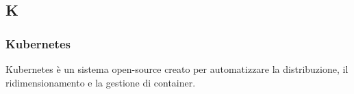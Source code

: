 \subsection*{\textbf{\hfill \Huge{K} \hfill}} 
\subsubsection*{Kubernetes}
Kubernetes è un sistema open-source creato per automatizzare la distribuzione, il ridimensionamento e la gestione di container. 